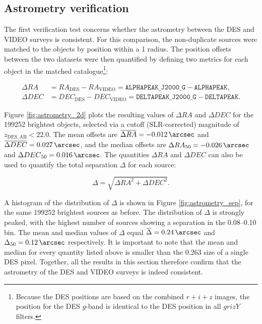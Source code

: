 \subsection{Astrometry verification}\label{subsection:astrometry}
The first verification test concerns whether the astrometry between the DES and VIDEO surveys is consistent. For this comparison, the non-duplicate \DESVIDEO sources were matched to the \cite{2013MNRAS.428.1281J} objects by position within a \SI{1}{\arcsec} radius. The position offsets between the two datasets were then quantified by defining two metrics for each object in the matched catalogue\footnote{Because the DES positions are based on the combined $r+i+z$ images, the position for the DES $g$-band is identical to the DES position in all $grizY$ filters.}: 

\begin{align}
\Delta RA &= RA_{\mathrm{DES}}-RA_{\mathrm{VIDEO}} = \texttt{ALPHAPEAK\_J2000\_G} - \texttt{ALPHAPEAK} \label{eqn:ra_offset},\\
\Delta DEC &= DEC_{\mathrm{DES}}-DEC_{\mathrm{VIDEO}} = \texttt{DELTAPEAK\_J2000\_G} - \texttt{DELTAPEAK}. \label{eqn:dec_offset}
\end{align}

Figure \ref{fig:astrometry_2d} plots the resulting values of $\Delta RA$ and $\Delta DEC$ for the \num{199 252} brightest objects, selected via a cutoff (SLR-corrected) magnitude of $z_{\mathrm{DES,AB}}<22.0$. The mean offsets are $\overbar{\Delta RA} = \SI{-0.012}{\arcsec}$  and $\overbar{\Delta DEC} = \SI{0.027}{\arcsec}$, and the median offsets are ${\Delta RA}_{50} = \SI{-0.026}{\arcsec}$ and ${\Delta DEC}_{50} = \SI{0.016}{\arcsec}$. The quantities $\Delta RA$ and $\Delta DEC$ can also be used to quantify the total separation $\Delta$ for each source:

\begin{equation}
    \Delta=\sqrt{{\Delta RA}^2 + {\Delta DEC}^2}.
\end{equation}

A histogram of the distribution of $\Delta$ is shown in Figure \ref{fig:astrometry_sep}, for the same \num{199 252} brightest sources as before. The distribution of $\Delta$ is strongly peaked, with the highest number of sources showing a separation in the \SIrange{0.08}{0.10}{\arcsec} bin. The mean and median values of $\Delta$ equal $\overbar{\Delta} = \SI{0.24}{\arcsec}$ and $\Delta_{50} = \SI{0.12}{\arcsec}$ respectively. It is important to note that the mean and median for every quantity listed above is smaller than the \SI{0.263}{\arcsec} size of a single DES pixel. Together, all the results in this section therefore confirm that the astrometry of the DES and VIDEO surveys is indeed consistent. \par



